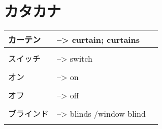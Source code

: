 \documentclass{article}
\begin{document}




\part*{カタカナ}
\begin{tabular}{ p{3cm} | l l }
カーテン&--> curtain; curtains \\ \hline\\[-1em]
スイッチ&--> switch \\ \hline\\[-1em]
オン&--> on \\ \hline\\[-1em]
オフ&--> off \\ \hline\\[-1em]
ブラインド&--> blinds /window blind \\ \hline\\[-1em]
\end{tabular}

\end{document}
